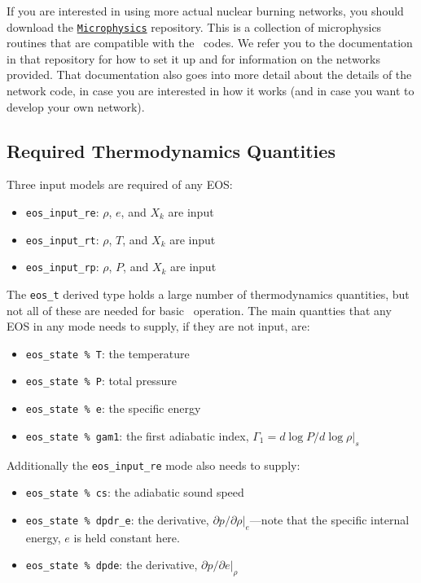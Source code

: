 If you are interested in using more actual nuclear burning networks,
you should download the \href{https://github.com/BoxLib-Codes/Microphysics}{\tt Microphysics}
repository. This is a collection of microphysics routines that are compatible with the
\boxlib\ codes. We refer you to the documentation in that repository for how to set it up
and for information on the networks provided. That documentation
also goes into more detail about the details of the network code, in case you are interested in
how it works (and in case you want to develop your own network).

\subsection{Required Thermodynamics Quantities}

Three input models are required of any EOS:
\begin{itemize}
\item {\tt eos\_input\_re}: $\rho$, $e$, and $X_k$ are input
\item {\tt eos\_input\_rt}: $\rho$, $T$, and $X_k$ are input
\item {\tt eos\_input\_rp}: $\rho$, $P$, and $X_k$ are input
\end{itemize}

The {\tt eos\_t} derived type holds a large number of thermodynamics
quantities, but not all of these are needed for basic
\castro\ operation.  The main quantties that any EOS in any mode needs to
supply, if they are not input, are:
\begin{itemize}
  \item {\tt eos\_state \% T}: the temperature
  \item {\tt eos\_state \% P}: total pressure
  \item {\tt eos\_state \% e}: the specific energy
  \item {\tt eos\_state \% gam1}: the first adiabatic index,
       $\Gamma_1 = d\log P / d\log \rho |_s$
\end{itemize}

Additionally the {\tt eos\_input\_re} mode also needs to supply:
\begin{itemize}
  \item {\tt eos\_state \% cs}: the adiabatic sound speed
  \item {\tt eos\_state \% dpdr\_e}: the derivative, $\partial
    p/\partial \rho |_e$---note that the specific internal energy, $e$
    is held constant here.
  \item {\tt eos\_state \% dpde}: the derivative, $\partial p /
    \partial e |_\rho$
\end{itemize}

